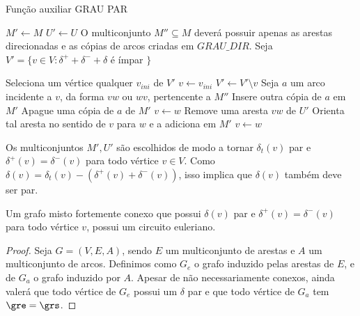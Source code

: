     \begin{algorithm}
    \caption{Função auxiliar GRAU PAR}
    \label{mixed-grau-par}
    \begin{algorithmic}[1]
            \State $M' \gets M$
            \State $U' \gets U$
            \State O multiconjunto $M'' \subseteq M$ deverá possuir apenas as arestas direcionadas e as cópias de arcos criadas em $GRAU\_DIR$.
            \State Seja $V' = \{v \in V : \delta^+ + \delta^- + \delta$ é ímpar $\}$

                \State Seleciona um vértice qualquer $v_{ini}$ de $V'$ 
                \State $v \gets v_{ini}$
                    \State $V' \gets V' \setminus v$
                    \Repeat 
                        \State Seja $a$ um arco incidente a $v$, da forma $vw$ ou $wv$, pertencente a $M''$
                            \State Insere outra cópia de $a$ em $M'$
                        \Else
                            \State Apague uma cópia de $a$ de $M'$
                        \EndIf
                        \State $v \gets w$
                    \Repeat
                        \State Remove uma aresta $vw$ de $U'$
                        \State Orienta tal aresta no sentido de $v$ para $w$ e a adiciona em $M'$
                        \State $v \gets w$
                \EndWhile
            \EndWhile
        \EndFunction
    \end{algorithmic}
    \end{algorithm}

    Os multiconjuntos $M', U'$ são escolhidos de modo a tornar $\delta_t(v)$ par e $\delta^+(v) = \delta^-(v)$ para todo vértice $v \in V$.
    Como $\delta(v) = \delta_t(v) - (\delta^+(v) + \delta^-(v))$, isso implica que $\delta(v)$ também deve ser par.

    \begin{theorem}        
        \label{mixed-eulerian}
        Um grafo misto fortemente conexo que possui $\delta(v)$ par e $\delta^+(v) = \delta^-(v)$ para todo vértice $v$, possui um circuito euleriano.
    \end{theorem}
    \begin{proof}
        Seja $G = (V, E, A)$, sendo $E$ um multiconjunto de arestas e $A$ um multiconjunto de arcos.
        Definimos como $G_e$ o grafo induzido pelas arestas de $E$, e de $G_a$ o grafo induzido por $A$.
        Apesar de não necessariamente conexos, ainda valerá que todo vértice de $G_e$ possui um $\delta$ par e que todo vértice de $G_a$ tem $\gre = \grs$.
        
                
    \end{proof}



